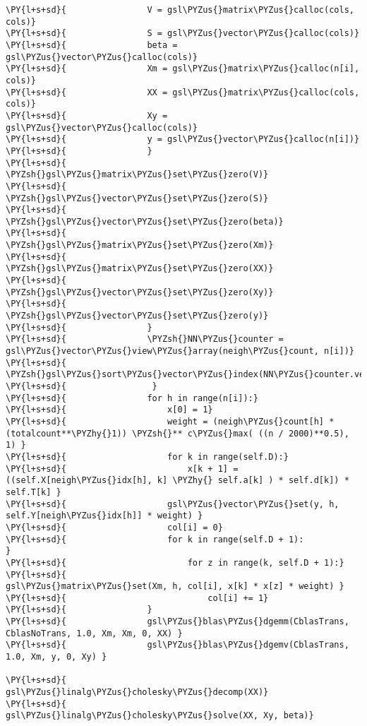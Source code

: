 \begin{Verbatim}[commandchars=\\\{\}]
\PY{l+s+sd}{                V = gsl\PYZus{}matrix\PYZus{}calloc(cols, cols)}
\PY{l+s+sd}{                S = gsl\PYZus{}vector\PYZus{}calloc(cols)}
\PY{l+s+sd}{                beta = gsl\PYZus{}vector\PYZus{}calloc(cols)}
\PY{l+s+sd}{                Xm = gsl\PYZus{}matrix\PYZus{}calloc(n[i], cols)}
\PY{l+s+sd}{                XX = gsl\PYZus{}matrix\PYZus{}calloc(cols, cols)}
\PY{l+s+sd}{                Xy = gsl\PYZus{}vector\PYZus{}calloc(cols)}
\PY{l+s+sd}{                y = gsl\PYZus{}vector\PYZus{}calloc(n[i])}
\PY{l+s+sd}{                }
\PY{l+s+sd}{                \PYZsh{}gsl\PYZus{}matrix\PYZus{}set\PYZus{}zero(V)}
\PY{l+s+sd}{                \PYZsh{}gsl\PYZus{}vector\PYZus{}set\PYZus{}zero(S)}
\PY{l+s+sd}{                \PYZsh{}gsl\PYZus{}vector\PYZus{}set\PYZus{}zero(beta)}
\PY{l+s+sd}{                \PYZsh{}gsl\PYZus{}matrix\PYZus{}set\PYZus{}zero(Xm)}
\PY{l+s+sd}{                \PYZsh{}gsl\PYZus{}matrix\PYZus{}set\PYZus{}zero(XX)}
\PY{l+s+sd}{                \PYZsh{}gsl\PYZus{}vector\PYZus{}set\PYZus{}zero(Xy)}
\PY{l+s+sd}{                \PYZsh{}gsl\PYZus{}vector\PYZus{}set\PYZus{}zero(y)}
\PY{l+s+sd}{                }
\PY{l+s+sd}{                \PYZsh{}NN\PYZus{}counter = gsl\PYZus{}vector\PYZus{}view\PYZus{}array(neigh\PYZus{}count, n[i])}
\PY{l+s+sd}{                \PYZsh{}gsl\PYZus{}sort\PYZus{}vector\PYZus{}index(NN\PYZus{}counter.vector)}
\PY{l+s+sd}{                 }
\PY{l+s+sd}{                for h in range(n[i]):}
\PY{l+s+sd}{                    x[0] = 1}
\PY{l+s+sd}{                    weight = (neigh\PYZus{}count[h] * (totalcount**\PYZhy{}1)) \PYZsh{}** c\PYZus{}max( ((n / 2000)**0.5), 1) }
\PY{l+s+sd}{                    for k in range(self.D):}
\PY{l+s+sd}{                        x[k + 1] = ((self.X[neigh\PYZus{}idx[h], k] \PYZhy{} self.a[k] ) * self.d[k]) * self.T[k] }
\PY{l+s+sd}{                    gsl\PYZus{}vector\PYZus{}set(y, h, self.Y[neigh\PYZus{}idx[h]] * weight) }
\PY{l+s+sd}{                    col[i] = 0}
\PY{l+s+sd}{                    for k in range(self.D + 1):             }
\PY{l+s+sd}{                        for z in range(k, self.D + 1):}
\PY{l+s+sd}{                            gsl\PYZus{}matrix\PYZus{}set(Xm, h, col[i], x[k] * x[z] * weight) }
\PY{l+s+sd}{                            col[i] += 1}
\PY{l+s+sd}{                }
\PY{l+s+sd}{                gsl\PYZus{}blas\PYZus{}dgemm(CblasTrans, CblasNoTrans, 1.0, Xm, Xm, 0, XX) }
\PY{l+s+sd}{                gsl\PYZus{}blas\PYZus{}dgemv(CblasTrans, 1.0, Xm, y, 0, Xy) }

\PY{l+s+sd}{                gsl\PYZus{}linalg\PYZus{}cholesky\PYZus{}decomp(XX)}
\PY{l+s+sd}{                gsl\PYZus{}linalg\PYZus{}cholesky\PYZus{}solve(XX, Xy, beta)}


\end{Verbatim}
